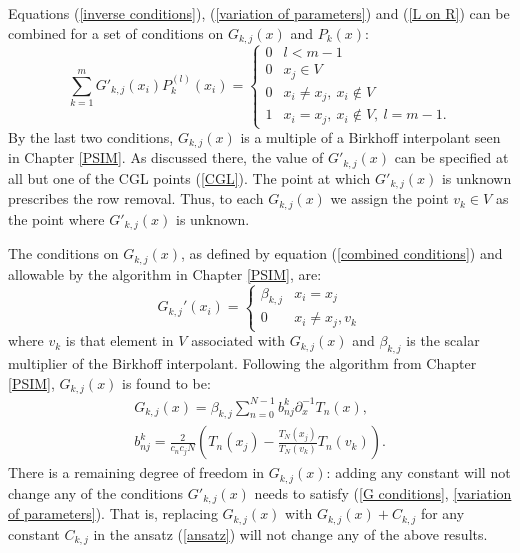 \documentclass{book}
\begin{document}
Equations (\ref{inverse conditions}), (\ref{variation of parameters}) and (\ref{L on R}) can be combined for a set of conditions on $G_{k,j}(x)$ and $P_k(x)$:
\begin{equation} \label{combined conditions}
\sum_{k=1}^m G'_{k,j}(x_i) P_k^{(l)}(x_i) = \begin{cases} 0 & l < m-1 \\
0 & x_j \in V \\
0 & x_i \neq x_j, \ x_i \notin V \\
1 & x_i = x_j, \ x_i \notin V , \ l = m-1.\end{cases} 
\end{equation}
By the last two conditions, $G_{k,j}(x)$ is a multiple of a Birkhoff interpolant seen in Chapter \ref{PSIM}.
As discussed there, the value of $G'_{k,j}(x)$ can be specified at all but one of the CGL points (\ref{CGL}).
The point at which $G'_{k,j}(x)$ is unknown prescribes the row removal.
Thus, to each $G_{k,j}(x)$ we assign the point $v_k \in V$ as the point where $G'_{k,j}(x)$ is unknown.

The conditions on $G_{k,j}(x)$, as defined by equation (\ref{combined conditions}) and allowable by the algorithm in Chapter \ref{PSIM}, are:
\begin{equation} \label{G conditions}
G_{k,j}'(x_i) = \begin{cases} \beta_{k,j} & x_i = x_j \\ 0 & x_i \neq x_j, v_k \end{cases}
\end{equation}
where $v_k$ is that element in $V$ associated with $G_{k,j}(x)$
and $\beta_{k,j}$ is the scalar multiplier of the Birkhoff interpolant.
Following the algorithm from Chapter \ref{PSIM}, $G_{k,j}(x)$ is found to be:
\begin{equation} \label{eq:G functions}
\begin{gathered}
G_{k,j} (x) = \beta_{k,j} \sum_{n=0}^{N-1} b^k_{nj} \partial_x^{-1} T_n(x), \\
 b^k_{nj} = \frac{2}{c_n c_j N} \left ( T_n(x_j) - \frac{T_N(x_j)}{T_N(v_k)} T_n(v_k) \right ).
\end{gathered}
\end{equation}
There is a remaining degree of freedom in $G_{k,j}(x)$: 
adding any constant will not change any of the conditions $G'_{k,j}(x)$ needs to satisfy (\ref{G conditions}, \ref{variation of parameters}).
That is, replacing $G_{k,j}(x)$ with $G_{k,j}(x) + C_{k,j}$ for any constant $C_{k,j}$ in the ansatz (\ref{ansatz}) will not change any of the above results.
\end{document}

